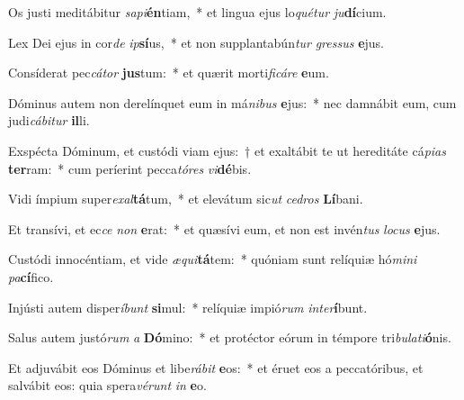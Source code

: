 \item Os justi meditábitur \textit{sa}\textit{pi}\textbf{én}tiam,~* et lingua ejus lo\textit{qué}\textit{tur} \textit{ju}\textbf{dí}cium.
\item Lex Dei ejus in cor\textit{de} \textit{ip}\textbf{sí}us,~* et non supplantabún\textit{tur} \textit{gres}\textit{sus} \textbf{e}jus.
\item Consíderat pec\textit{cá}\textit{tor} \textbf{jus}tum:~* et quærit morti\textit{fi}\textit{cá}\textit{re} \textbf{e}um.
\item Dóminus autem non derelínquet eum in má\textit{ni}\textit{bus} \textbf{e}jus:~* nec damnábit eum, cum judi\textit{cá}\textit{bi}\textit{tur} \textbf{il}li.
\item Exspécta Dóminum, et custódi viam ejus:~† et exaltábit te ut hereditáte cá\textit{pi}\textit{as} \textbf{ter}ram:~* cum períerint pecca\textit{tó}\textit{res} \textit{vi}\textbf{dé}bis.
\item Vidi ímpium super\textit{ex}\textit{al}\textbf{tá}tum,~* et elevátum sic\textit{ut} \textit{ce}\textit{dros} \textbf{Lí}bani.
\item Et transívi, et ec\textit{ce} \textit{non} \textbf{e}rat:~* et quæsívi eum, et non est invén\textit{tus} \textit{lo}\textit{cus} \textbf{e}jus.
\item Custódi innocéntiam, et vide \textit{æ}\textit{qui}\textbf{tá}tem:~* quóniam sunt relíquiæ hó\textit{mi}\textit{ni} \textit{pa}\textbf{cí}fico.
\item Injústi autem disper\textit{í}\textit{bunt} \textbf{si}mul:~* relíquiæ impió\textit{rum} \textit{in}\textit{ter}\textbf{í}bunt.
\item Salus autem justó\textit{rum} \textit{a} \textbf{Dó}mino:~* et protéctor eórum in témpore tri\textit{bu}\textit{la}\textit{ti}\textbf{ó}nis.
\item Et adjuvábit eos Dóminus et libe\textit{rá}\textit{bit} \textbf{e}os:~* et éruet eos a peccatóribus, et salvábit eos: quia spera\textit{vé}\textit{runt} \textit{in} \textbf{e}o.
